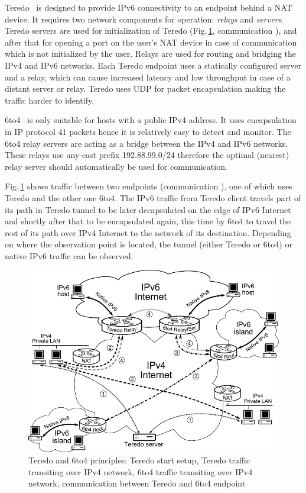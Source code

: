 Teredo~\cite{rfc4380} is designed to provide IPv6 connectivity to an endpoint behind a NAT device. It requires two network components for operation: \emph{relays} and \emph{servers}. Teredo servers are used for initialization of Teredo (Fig.\,\ref{fig:ipv6-tunnels-monitoring-schema}, communication ), and after that for opening a port on the user's NAT device in case of communication which is not initialized by the user. Relays are used for routing and bridging the IPv4 and IPv6 networks. Each Teredo endpoint uses a statically configured server and a relay, which can cause increased latency and low throughput in case of a distant server or relay. Teredo uses UDP for packet encapsulation making the traffic harder to identify.

6to4~\cite{rfc3056} is only suitable for hosts with a public IPv4 address. It uses encapsulation in IP protocol 41 packets hence it is relatively easy to detect and monitor. The 6to4 relay servers are acting as a bridge between the IPv4 and IPv6 networks. These relays use any-cast prefix 192.88.99.0/24 therefore the optimal (nearest) relay server should automatically be used for communication.

Fig.\,\ref{fig:ipv6-tunnels-monitoring-schema} shows traffic between two endpoints (communication ), one of which uses Teredo and the other one 6to4. The IPv6 traffic from Teredo client travels part of its path in Teredo tunnel to be later decapsulated on the edge of IPv6 Internet and shortly after that to be encapsulated again, this time by 6to4 to travel the rest of its path over IPv4 Internet to the network of its destination. Depending on where the observation point is located, the tunnel (either Teredo or 6to4) or native IPv6 traffic can be observed.

\begin{figure}[!tb]
        \centering
        \includegraphics[width=1.00\linewidth]{figures/paper-tunnels/tunely-schema}
        \caption{Teredo and 6to4 principles:  Teredo start setup,  Teredo traffic transiting over IPv4 network,  6to4 traffic transiting over IPv4 network,  communication between Teredo and 6to4 endpoint}
        \label{fig:ipv6-tunnels-monitoring-schema}
\end{figure}

